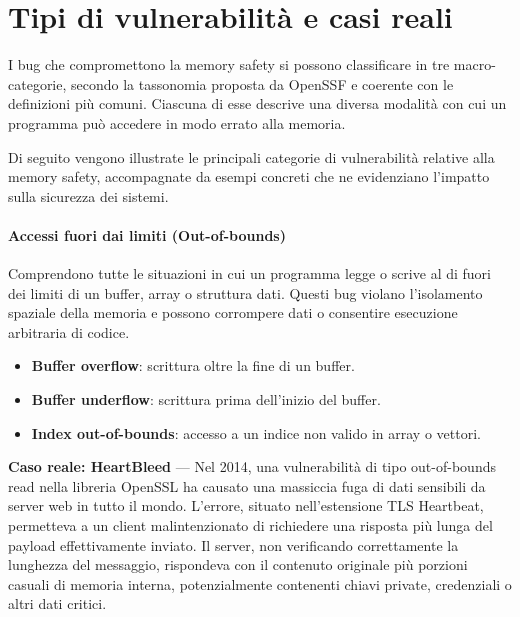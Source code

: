 \section{Tipi di vulnerabilità e casi reali}
\label{sec:vulnerability_types}

I bug che compromettono la memory safety si possono classificare in tre macro-categorie,
secondo la tassonomia proposta da OpenSSF\cite{memory_safety_continuum_definition}
e coerente con le definizioni più comuni\cite{wikipedia_definition}. Ciascuna di
esse descrive una diversa modalità con cui un programma può accedere in modo errato
alla memoria.

Di seguito vengono illustrate le principali categorie di vulnerabilità relative alla
memory safety, accompagnate da esempi concreti che ne evidenziano l'impatto
sulla sicurezza dei sistemi.

\paragraph{Accessi fuori dai limiti (Out-of-bounds)}
\label{sec:oob}

Comprendono tutte le situazioni in cui un programma legge o scrive al di fuori
dei limiti di un buffer, array o struttura dati. Questi bug violano l'isolamento
spaziale della memoria e possono corrompere dati o consentire esecuzione
arbitraria di codice.

\begin{itemize}
  \item \textbf{Buffer overflow}: scrittura oltre la fine di un buffer.

  \item \textbf{Buffer underflow}: scrittura prima dell'inizio del buffer.

  \item \textbf{Index out-of-bounds}: accesso a un indice non valido in array o vettori.
\end{itemize}

\textbf{Caso reale: HeartBleed} — Nel 2014, una vulnerabilità di tipo out-of-bounds
read nella libreria OpenSSL ha causato una massiccia fuga di dati sensibili da server
web in tutto il mondo. L'errore, situato nell'estensione TLS Heartbeat,
permetteva a un client malintenzionato di richiedere una risposta più lunga del
payload effettivamente inviato. Il server, non verificando correttamente la
lunghezza del messaggio, rispondeva con il contenuto originale più porzioni casuali
di memoria interna, potenzialmente contenenti chiavi private, credenziali o altri
dati critici\cite{heartbleed}.

